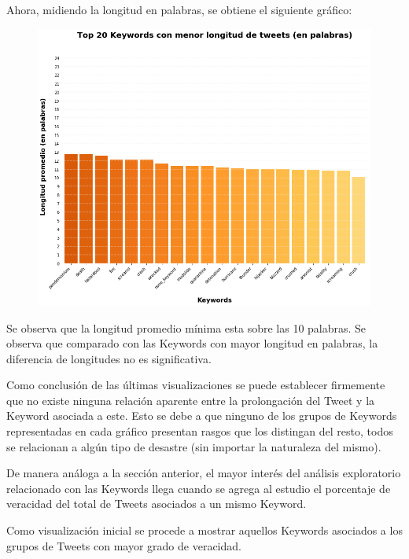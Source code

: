 \documentclass[titlepage,a4paper]{article}
\begin{document}
    Ahora, midiendo la longitud en palabras, se obtiene el siguiente gráfico:
    \begin{figure}[H]
    \centering
    \includegraphics[width=1\textwidth]{graficos/Analisis de Keyword/top_20_keywords_con_menor_long_de_tweets.png}
    \caption{} 
    \end{figure}
    Se observa que la longitud promedio mínima esta sobre las 10 palabras. Se observa que comparado con las Keywords con mayor longitud en palabras, la diferencia de longitudes no es significativa. 
    
    Como conclusión de las últimas visualizaciones se puede establecer firmemente que no existe ninguna relación aparente entre la prolongación del Tweet y la Keyword asociada a este. Esto se debe a que ninguno de los grupos de Keywords representadas en cada gráfico presentan rasgos que los distingan del resto, todos se relacionan a algún tipo de desastre (sin importar la naturaleza del mismo).
    
    De manera análoga a la sección anterior, el mayor interés del análisis exploratorio relacionado con las Keywords llega cuando se agrega al estudio el porcentaje de veracidad del total de Tweets asociados a un mismo Keyword.    
    
    Como visualización inicial se procede a mostrar aquellos Keywords asociados a los grupos de Tweets con mayor grado de veracidad.
    
\end{document}
